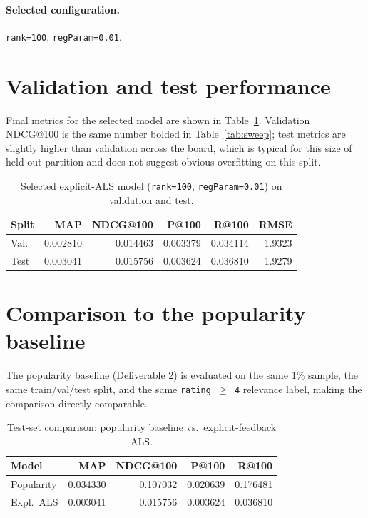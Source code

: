 \documentclass[10pt,twocolumn]{article}
\begin{document}
\paragraph{Selected configuration.} \texttt{rank=100}, \texttt{regParam=0.01}.

\section{Validation and test performance}
Final metrics for the selected model are shown in Table~\ref{tab:valtest}. Validation NDCG@100 is the same number bolded in Table~\ref{tab:sweep}; test metrics are slightly higher than validation across the board, which is typical for this size of held-out partition and does not suggest obvious overfitting on this split.

\begin{table}[!ht]
\centering
\caption{Selected explicit-ALS model (\texttt{rank=100}, \texttt{regParam=0.01}) on validation and test.}
\label{tab:valtest}
\footnotesize
\setlength{\tabcolsep}{3pt}
\begin{tabular}{l r r r r r}
\toprule
\textbf{Split} & \textbf{MAP} & \textbf{NDCG@100} & \textbf{P@100} & \textbf{R@100} & \textbf{RMSE} \\
\midrule
Val.  & 0.002810 & 0.014463 & 0.003379 & 0.034114 & 1.9323 \\
Test  & 0.003041 & 0.015756 & 0.003624 & 0.036810 & 1.9279 \\
\bottomrule
\end{tabular}
\end{table}

\section{Comparison to the popularity baseline}
The popularity baseline (Deliverable 2) is evaluated on the same 1\% sample, the same train/val/test split, and the same \texttt{rating $\geq$ 4} relevance label, making the comparison directly comparable.

\begin{table}[t]
\centering
\caption{Test-set comparison: popularity baseline vs.\ explicit-feedback ALS.}
\label{tab:compare}
\footnotesize
\setlength{\tabcolsep}{3pt}
\begin{tabular}{l r r r r}
\toprule
\textbf{Model} & \textbf{MAP} & \textbf{NDCG@100} & \textbf{P@100} & \textbf{R@100} \\
\midrule
Popularity & 0.034330 & 0.107032 & 0.020639 & 0.176481 \\
Expl.~ALS  & 0.003041 & 0.015756 & 0.003624 & 0.036810 \\
\bottomrule
\end{tabular}
\end{table}
\end{document}
